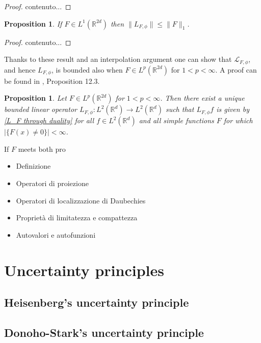 \documentclass[corpo=11pt, stile=classica, tipotesi=custom,
greek, evenboxes, english]{toptesi}
\numberwithin{equation}{chapter}
\newtheorem{prop}[teo]{Proposition}
\newcommand{\R}{\mathbb{R}} %
\renewcommand{\L}{\mathscr{L}} %
\begin{document}
\begin{proof}
	contenuto...
\end{proof}
\begin{prop}\label{F integrable L_F bounded}
	If $F \in L^1(\R^{2d})$ then $\| L_{F,\phi}\| \leq \| F \|_1$.
\end{prop}
\begin{proof}
	contenuto...
\end{proof}
Thanks to these result and an interpolation argument one can show that $\L_{F,\phi}$, and hence $L_{F,\phi}$, is bounded also when $F \in L^p(\R^{2d})$ for $1 < p < \infty$. A proof can be found in \cite{wong}, Proposition 12.3.
\begin{prop}\label{F in Lp L_F bounded}
	Let $F \in L^p(\R^{2d})$ for $1 < p < \infty$. Then there exist a unique bounded linear operator $L_{F,\phi} : L^2(\R^d) \rightarrow L^2(\R^d)$ such that $L_{F,\phi} f$ is given by \eqref{L_F through duality} for all $f \in L^2(\R^d)$ and all simple functions $F$ for which $|\{F(x) \neq 0\}| < \infty$.
\end{prop}

If $F$ meets both pro
\begin{itemize}
	\item Definizione
	\item Operatori di proiezione
	\item Operatori di localizzazione di Daubechies
	\item Proprietà di limitatezza e compattezza
	\item Autovalori e autofunzioni
\end{itemize}



\chapter{Uncertainty principles}\label{chapter uncertainty principles}
\section{Heisenberg's uncertainty principle}\label{section Heisenberg's UP}
\section{Donoho-Stark's uncertainty principle}\label{section Donoho-Stark's UP}
\end{document}
